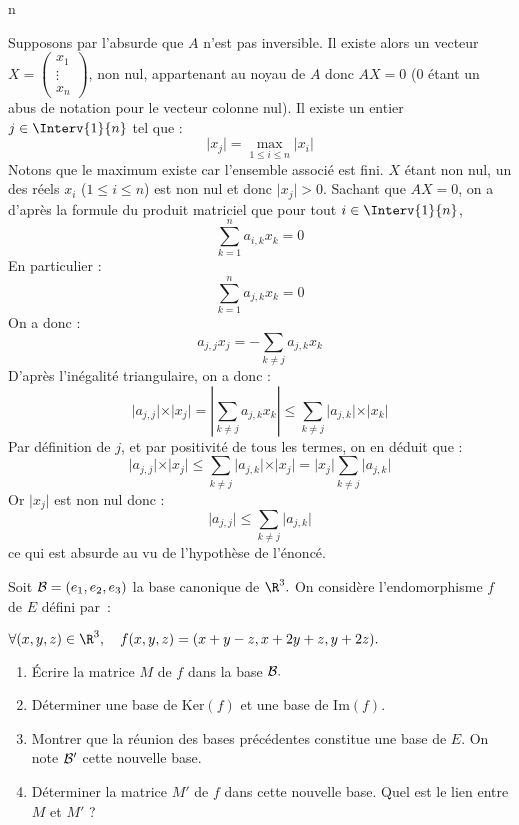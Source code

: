 n\documentclass[a4paper,10pt]{report}
\begin{document}
\corr Supposons par l'absurde que $A$ n'est pas inversible. Il existe alors un vecteur $X = \begin{pmatrix}
x_1 \\
\vdots \\
x_n
\end{pmatrix}$, non nul, appartenant au noyau de $A$ donc $AX= 0$ ($0$ étant un abus de notation pour le vecteur colonne nul). Il existe un entier $j \in \Interv{1}{n}$ tel que :
$$ \vert x_j \vert = \max_{1 \leq i \leq n} \vert x_i \vert$$
Notons que le maximum existe car l'ensemble associé est fini. $X$ étant non nul, un des réels $x_i$ ($1 \leq i \leq n$) est non nul et donc $\vert x_j \vert >0$. Sachant que $AX=0$, on a d'après la formule du produit matriciel que pour tout $i \in \Interv{1}{n}$,
$$ \sum_{k=1}^n a_{i,k} x_k = 0$$
En particulier :
$$ \sum_{k=1}^n a_{j,k} x_k = 0$$
On a donc :
$$ a_{j,j} x_j = - \sum_{k \neq j} a_{j,k} x_k$$
D'après l'inégalité triangulaire, on a donc :
$$ \vert a_{j,j} \vert \times \vert x_j \vert = \left\vert  \sum_{k \neq j} a_{j,k} x_k \right\vert \leq \sum_{k \neq j} \vert a_{j,k} \vert \times \vert x_k \vert$$
Par définition de $j$, et par positivité de tous les termes, on en déduit que :
$$  \vert a_{j,j} \vert \times \vert x_j \vert \leq \sum_{k \neq j} \vert a_{j,k} \vert \times \vert x_j \vert =  \vert x_j \vert\sum_{k \neq j} \vert a_{j,k} \vert$$
Or $\vert x_j \vert$ est non nul donc :
$$ \vert a_{j,j} \vert  \leq  \sum_{k \neq j} \vert a_{j,k} \vert$$
ce qui est absurde au vu de l'hypothèse de l'énoncé.

\begin{Exa} Soit ${\cal B}=(e_1,e_2,e_3)$ la base canonique de $\R^3.$ On consid\`ere
l'endomorphisme $f$ de $E$ d\'efini par~:

\begin{center}
$\forall (x,y,z)\in\R^3,\quad f(x,y,z)=(x+y-z,x+2y+z,y+2z).$
\end{center}

\begin{enumerate}

\item Écrire la matrice $M$ de $f$ dans la base ${\cal B}.$

\item D\'eterminer une base de $\textrm{Ker}(f)$ et une base de $\textrm{Im}(f)$.

\item Montrer que la r\'eunion des bases pr\'ec\'edentes constitue une base de $E$. On note ${\cal B}'$ cette nouvelle base.

\item  D\'eterminer la matrice $M'$ de $f$ dans cette nouvelle base. Quel est le lien entre $M$ et $M'$ ?
\end{enumerate}

\end{Exa}
\end{document}

